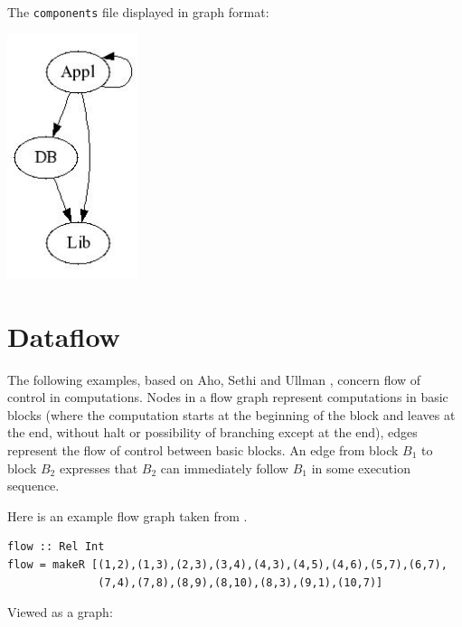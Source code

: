 \documentclass[11pt]{article}
\newlength{\fminilength}
\newenvironment{fminipage}[1][\linewidth]
 {\setlength{\fminilength}{#1-2\fboxsep-2\fboxrule-1em}%
  \bigskip\begin{lrbox}{\fminibox}\quad\begin{minipage}{\fminilength}\bigskip}
 {\smallskip\end{minipage}\end{lrbox}\noindent\fbox{\usebox{\fminibox}}\bigskip}
\newcommand{\bc}{\begin{fminipage}}
\newcommand{\ec}{\end{fminipage}}
\begin{document}
The \verb^components^ file displayed in graph format: 

\begin{center}
\includegraphics[width=1.5in]{components}
\end{center}

\section{Dataflow} 

The following examples,  based on Aho, Sethi and Ullman 
\cite{AhoSetUll:cptt}, 
concern flow of control in computations. Nodes in a flow graph
represent computations in basic blocks (where the computation 
starts at the beginning of the block and leaves at the end, without
halt or possibility of branching except at the end), 
edges represent the flow of control between basic blocks. 
An edge from block $B_1$ to block $B_2$ expresses that $B_2$ can 
immediately follow $B_1$ in some execution sequence. 

Here is an example flow graph taken from \cite{AhoSetUll:cptt}.

\bc\begin{verbatim}
flow :: Rel Int
flow = makeR [(1,2),(1,3),(2,3),(3,4),(4,3),(4,5),(4,6),(5,7),(6,7),
              (7,4),(7,8),(8,9),(8,10),(8,3),(9,1),(10,7)]
\end{verbatim}\ec

Viewed as a graph: 
\end{document}

